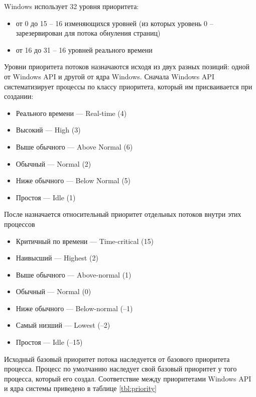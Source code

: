 Windows использует 32 уровня приоритета:
\begin{itemize}
	\item от 0 до 15 -- 16 изменяющихся уровней (из которых уровень 0 -- зарезервирован для потока обнуления страниц)
	\item от 16 до 31 -- 16 уровней реального времени
\end{itemize}

Уровни приоритета потоков назначаются исходя из двух разных позиций: одной от Windows API и другой от ядра Windows. Сначала Windows API систематизирует процессы по классу приоритета, который им присваивается при создании:
\begin{itemize}
	\item Реального времени — Real-time (4)
	\item Высокий — High (3)
	\item Выше обычного — Above Normal (6)
	\item Обычный — Normal (2)
	\item Ниже обычного — Below Normal (5)
	\item Простоя — Idle (1)
\end{itemize}

После назначается относительный приоритет отдельных потоков внутри этих процессов
\begin{itemize}
	\item Критичный по времени — Time-critical (15)
	\item Наивысший — Highest (2)
	\item Выше обычного — Above-normal (1)
	\item Обычный — Normal (0)
	\item Ниже обычного — Below-normal (–1)
	\item Самый низший — Lowest (–2)
	\item Простоя — Idle (–15)
\end{itemize}

Исходный базовый приоритет потока наследуется от базового приоритета процесса. Процесс по умолчанию наследует свой базовый приоритет у того процесса, который его создал. Соответствие между приоритетами Windows API и ядра системы приведено в таблице \ref{tbl:priority}


